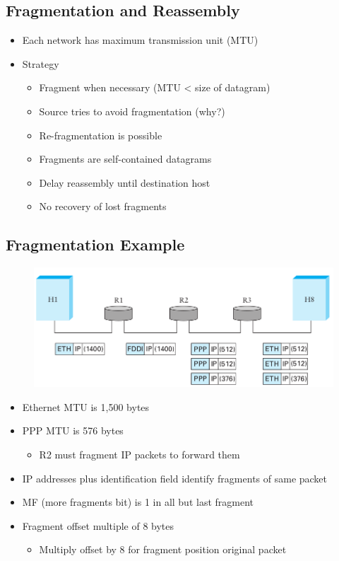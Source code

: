 \subsection{Fragmentation and Reassembly}
\begin{itemize}[nosep]
    \item Each network has maximum transmission unit (MTU)
    \item Strategy
          \begin{itemize}[nosep]
              \item Fragment when necessary (MTU < size of datagram)
              \item Source tries to avoid fragmentation (why?)
              \item Re-fragmentation is possible
              \item Fragments are self-contained datagrams
              \item Delay reassembly until destination host
              \item No recovery of lost fragments
          \end{itemize}
\end{itemize}

\subsection{Fragmentation Example}
\begin{figure}[H]
    \includegraphics[scale=0.5]{lazy/fragmentationexample.png}
\end{figure}
\begin{itemize}[nosep]
    \item Ethernet MTU is 1,500 bytes
    \item PPP MTU is 576 bytes
          \begin{itemize}[nosep]
              \item R2 must fragment IP packets to forward them
          \end{itemize}
    \item IP addresses plus identification field identify fragments of same packet
    \item MF (more fragments bit) is 1 in all but last fragment
    \item Fragment offset multiple of 8 bytes
          \begin{itemize}[nosep]
              \item Multiply offset by 8 for fragment position original packet
          \end{itemize}
\end{itemize}

